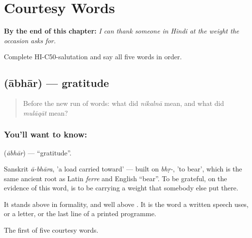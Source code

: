 
\chapter{Courtesy Words}
\label{ch:hi-courtesy}

\begin{chapteropening}
\textbf{By the end of this chapter:} \emph{I can thank someone in Hindi at the weight the occasion asks for.}

Complete HI-C50-salutation and say all five words in order.
\end{chapteropening}

\section[\texorpdfstring{\hi{आभार} (ābhār)}{आभार (ābhār)}]{ (ābhār) — gratitude}

\label{lesson:HI-C50-gratitude}



\begin{quote}
Before the new run of words: what did \emph{nikalnā} mean, and what did \emph{mulāqāt} mean?
\end{quote}

\subsection*{You'll want to know: }
\textbf{} (\emph{ābhār}) — \textquotedblleft{}gratitude\textquotedblright{}.

Sanskrit \emph{ā-bhāra}, 'a load carried toward' — built on \emph{bhṛ-}, 'to bear', which is the same ancient root as Latin \emph{ferre} and English \textquotedblleft{}bear\textquotedblright{}. To be grateful, on the evidence of this word, is to be carrying a weight that somebody else put there.

It stands above  in formality, and well above . It is the word a written speech uses, or a letter, or the last line of a printed programme.

\begin{grammarlens}[title={What you've built}]
The first of five courtesy words.
\end{grammarlens}


